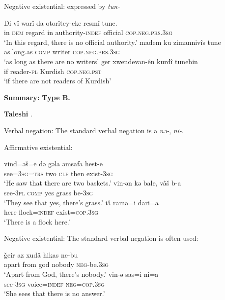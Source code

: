 ﻿\documentclass[output=paper]{langsci/langscibook}
\begin{document}
\begin{unindented}
Negative existential: expressed by \textit{tun-} 
%
\begin{exe}\ex \gll Di vî warî    da otorîtey-eke resmî   tune.  \\
in  \textsc{dem}    regard in  authority-\textsc{indef}  official \textsc{cop.neg.prs.3sg} \\
    \glt `In this regard, there is no official authority.' \citep[32]{Thackston2006}
\ex \gll madem ku zimannivîs tune \\
as.long.as  \textsc{comp}    writer \textsc{cop.neg.prs.3sg} \\
    \glt `as long as there are no writers' \citep[32]{Thackston2006}
\ex \gll ger xwendevan-ên kurdî tunebin \\
if reader-\textsc{pl} Kurdish  \textsc{cop.neg.pst} \\
    \glt `if there are not readers of Kurdish' \citep[31]{Thackston2006}
    \end{exe}

\textbf{Summary: Type B.}

\textbf{Taleshi} \parencite{Paul2011}. 

Verbal negation: The standard verbal negation is a \textit{nə-}, \textit{ni-}.

Affirmative existential:
%
\begin{exe}\ex
    \gll vind=əš=e də   gəla əmsafa hest-e \\
see=\textsc{3sg}=\textsc{trs} two \textsc{clf} then exist-\textsc{3sg} \\
    \glt `He saw that there are two baskets.' \citep[358]{Paul2011}
\ex \gll vin-ən kə bale, vâš    b-a \\
see-\textsc{3pl} \textsc{comp}     yes   grass be-\textsc{3sg} \\
    \glt `They see that yes, there's grass.' \citep[210]{Paul2011}
\ex \gll iâ rama=i dari=a \\
here flock=\textsc{indef} exist=\textsc{cop.3sg} \\
    \glt `There is a flock here.' \citep[243]{Paul2011}
    \end{exe}

Negative existential: The standard verbal negation is often used:
%
\begin{exe}\ex \gll ǧeir   az   xudâ hikas    ne-bu \\
apart  from  god   nobody \textsc{neg}-be.\textsc{3sg} \\
    \glt `Apart from God, there's nobody.' \citep[176]{Paul2011}
\ex \gll vin-ə sas=i ni=a \\
see-\textsc{3sg} voice=\textsc{indef}  \textsc{neg=cop.3sg} \\
    \glt `She sees that there is no answer.' \citep[422]{Paul2011}
    \end{exe}


\end{unindented}
\end{document}
